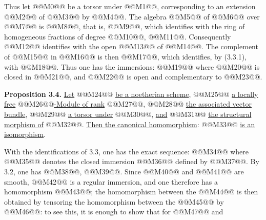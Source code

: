 
Thus let @@M0@@ be a torsor under @@M1@@, corresponding to an extension @@M2@@ of @@M3@@ by @@M4@@. The algebra @@M5@@ of @@M6@@ over @@M7@@ is @@M8@@, that is, @@M9@@, which identifies with the ring of homogeneous fractions of degree @@M10@@, @@M11@@. Consequently @@M12@@ identifies with the open @@M13@@ of @@M14@@. The complement of @@M15@@ in @@M16@@ is then @@M17@@, which identifies, by (3.3.1), with @@M18@@. Thus one has the immersions:
@@M19@@
where @@M20@@ is closed in @@M21@@, and @@M22@@ is open and complementary to @@M23@@.

\textbf{Proposition 3.4.} \uline{Let} @@M24@@ \uline{be a noetherian scheme}, @@M25@@ \uline{a locally free} @@M26@@\uline{-Module of rank} @@M27@@, @@M28@@ \uline{the associated vector bundle}, @@M29@@ \uline{a torsor under} @@M30@@, \uline{and} @@M31@@ \uline{the structural morphism of} @@M32@@. \uline{Then the canonical homomorphism}:
@@M33@@
\uline{is an isomorphism}.

With the identifications of 3.3, one has the exact sequence:
@@M34@@
where @@M35@@ denotes the closed immersion @@M36@@ defined by @@M37@@. By 3.2, one has @@M38@@, @@M39@@.
Since @@M40@@ and @@M41@@ are smooth, @@M42@@ is a regular immersion, and one therefore has a homomorphism @@M43@@; the homomorphism between the @@M44@@ is then obtained by tensoring the homomorphism between the @@M45@@ by @@M46@@: to see this, it is enough to show that for @@M47@@ and

